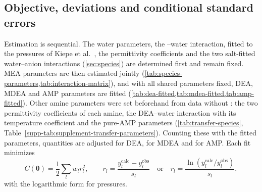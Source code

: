 \subsection{Objective, deviations and conditional standard errors}\label{sec:parameters}
Estimation is sequential.
The water parameters, the \COtwo--water interaction, fitted to the pressures of Kiepe et al.\ \cite{kiepeExperimentalDeterminationPrediction2002}, the permittivity coefficients and the two salt-fitted water--anion interactions (\cref{sec:species}) are determined first and remain fixed.
 MEA parameters are then estimated jointly (\cref{tab:species-parameters,tab:interaction-matrix}), and with all shared parameters fixed,  DEA,  MDEA and  AMP parameters are fitted (\cref{tab:dea-fitted,tab:mdea-fitted,tab:amp-fitted}).
Other amine parameters were set beforehand from data without \COtwo: the two permittivity coefficients of each amine, the DEA--water interaction with its temperature coefficient and the  pure-AMP parameters (\cref{tab:transfer-species}, Table~\ref{supp-tab:supplement-transfer-parameters}).
Counting these with the fitted parameters,  quantities are adjusted for DEA,  for MDEA and  for AMP.
Each fit minimizes
\begin{equation}
 C(\boldsymbol\theta)=\frac12\sum_lw_lr_l^2,\qquad
 r_l=\frac{y_l^{\mathrm{calc}}-y_l^{\mathrm{obs}}}{s_l}
 \quad\text{or}\quad
 r_l=\frac{\ln(y_l^{\mathrm{calc}}/y_l^{\mathrm{obs}})}{s_l},
 \label{eq:fit-objective}
\end{equation}
with the logarithmic form for pressures.

